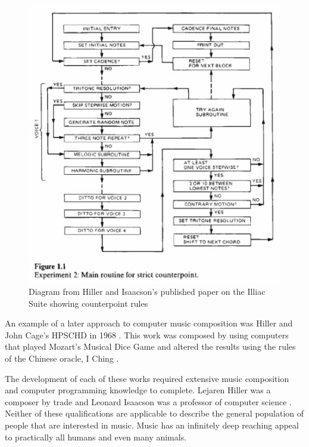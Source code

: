 \begin{figure}[p]
	\centering
	\caption{Diagram from Hiller and Isaacson's published paper on the Illiac Suite showing counterpoint rules \cite{Hiller_1992}}
	\includegraphics[width=\textwidth]{images/illiacChart}
\end{figure}

\pagebreak

An example of a later approach to computer music composition was Hiller and John Cage's HPSCHD in 1968 \cite{Brit_2018}.  This work was composed by using computers that played Mozart's Musical Dice Game and altered the results using the rules of the Chinese oracle, I Ching \cite{Brit_2018}.

\vspace{\baselineskip}

The development of each of these works required extensive music composition and computer programming knowledge to complete.  Lejaren Hiller was a composer by trade and Leonard Isaacson was a professor of computer science \cite{Brit_2018}.  Neither of these qualifications are applicable to describe the general population of people that are interested in music.  Music has an infinitely deep reaching appeal to practically all humans and even many animals.

